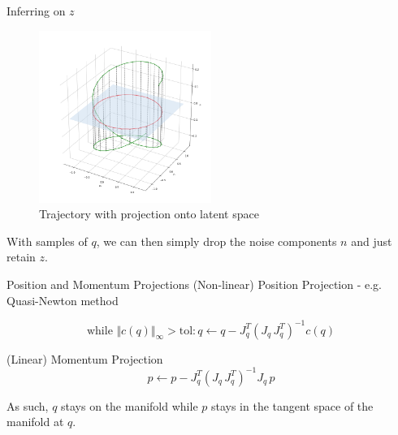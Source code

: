 \documentclass[10pt]{beamer}
\begin{document}
\begin{frame}[fragile]{Inferring on $z$}

    \begin{figure}
        \includegraphics[width=0.5\textwidth]{traj_0.1.png}
        \caption{Trajectory with projection onto latent space}
    \end{figure}
    
    With samples of $q$, we can then simply drop the noise components $n$ and just retain $z$.

\end{frame}

\begin{frame}[fragile]{Position and Momentum Projections}
    (Non-linear) Position Projection - e.g. Quasi-Newton method

    $$ \text{while } \Vert c(q) \Vert_\infty > \text{tol}: 
    q \leftarrow q - J_q^T ( J_q \, J_q^T)^{-1} c(q)$$ 
    
    (Linear) Momentum Projection
	$$ p \leftarrow p - J_q^T ( J_q \, J_q^T)^{-1} J_q \, p$$
	
	\alert{As such, $q$ stays on the manifold while $p$ stays in the tangent space of the manifold at $q$.}

\end{frame}
\end{document}

